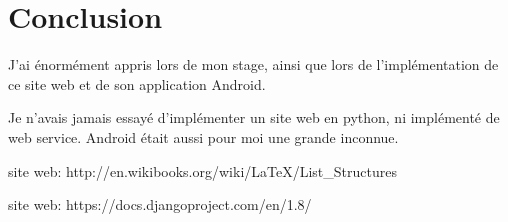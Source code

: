 \documentclass[12pt,table,a4paper]{report}
\begin{document}
\chapter{Conclusion}
J'ai énormément appris lors de mon stage, ainsi que lors de l'implémentation de ce site web et de son application Android.

Je n'avais jamais essayé d'implémenter un site web en python, ni implémenté de web service. Android était aussi pour moi une grande inconnue.

\begin{thebibliography}{breitestes Label}
	site web: http://en.wikibooks.org/wiki/LaTeX/List\_Structures
	
		site web: https://docs.djangoproject.com/en/1.8/
\end{thebibliography}
\end{document}
